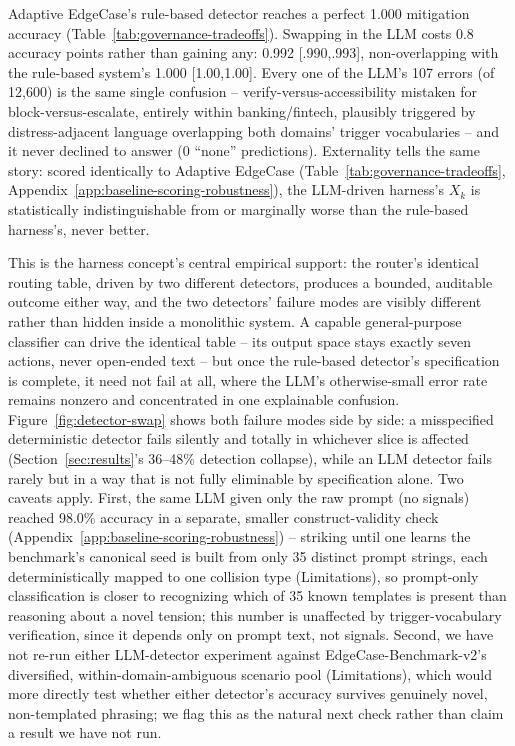 \documentclass[letterpaper]{article} %
\begin{document}
Adaptive EdgeCase's rule-based detector reaches a perfect 1.000 mitigation accuracy (Table~\ref{tab:governance-tradeoffs}). Swapping in the LLM costs 0.8 accuracy points rather than gaining any: 0.992 [.990,.993], non-overlapping with the rule-based system's 1.000 [1.00,1.00]. Every one of the LLM's 107 errors (of 12,600) is the same single confusion -- verify-versus-accessibility mistaken for block-versus-escalate, entirely within banking/fintech, plausibly triggered by distress-adjacent language overlapping both domains' trigger vocabularies -- and it never declined to answer (0 ``none'' predictions). Externality tells the same story: scored identically to Adaptive EdgeCase (Table~\ref{tab:governance-tradeoffs}, Appendix~\ref{app:baseline-scoring-robustness}), the LLM-driven harness's $X_k$ is statistically indistinguishable from or marginally worse than the rule-based harness's, never better.

This is the harness concept's central empirical support: the router's identical routing table, driven by two different detectors, produces a bounded, auditable outcome either way, and the two detectors' failure modes are visibly different rather than hidden inside a monolithic system. A capable general-purpose classifier can drive the identical table -- its output space stays exactly seven actions, never open-ended text -- but once the rule-based detector's specification is complete, it need not fail at all, where the LLM's otherwise-small error rate remains nonzero and concentrated in one explainable confusion. Figure~\ref{fig:detector-swap} shows both failure modes side by side: a misspecified deterministic detector fails silently and totally in whichever slice is affected (Section~\ref{sec:results}'s 36--48\% detection collapse), while an LLM detector fails rarely but in a way that is not fully eliminable by specification alone. Two caveats apply. First, the same LLM given only the raw prompt (no signals) reached 98.0\% accuracy in a separate, smaller construct-validity check (Appendix~\ref{app:baseline-scoring-robustness}) -- striking until one learns the benchmark's canonical seed is built from only 35 distinct prompt strings, each deterministically mapped to one collision type (Limitations), so prompt-only classification is closer to recognizing which of 35 known templates is present than reasoning about a novel tension; this number is unaffected by trigger-vocabulary verification, since it depends only on prompt text, not signals. Second, we have not re-run either LLM-detector experiment against EdgeCase-Benchmark-v2's diversified, within-domain-ambiguous scenario pool (Limitations), which would more directly test whether either detector's accuracy survives genuinely novel, non-templated phrasing; we flag this as the natural next check rather than claim a result we have not run.
\end{document}
